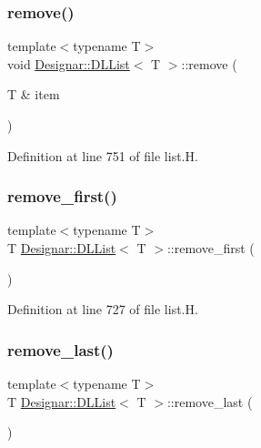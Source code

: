 \subsubsection{\texorpdfstring{remove()}{remove()}}
{\footnotesize\ttfamily template$<$typename T$>$ \\
void \hyperlink{class_designar_1_1_d_l_list}{Designar\+::\+D\+L\+List}$<$ T $>$\+::remove (\begin{DoxyParamCaption}\item[{T \&}]{item }\end{DoxyParamCaption})\hspace{0.3cm}{\ttfamily [inline]}}



Definition at line 751 of file list.\+H.

\mbox{\label{class_designar_1_1_d_l_list_a62e4c39df6ba191e7cd8dadac70109fb}} 
\subsubsection{\texorpdfstring{remove\+\_\+first()}{remove\_first()}}
{\footnotesize\ttfamily template$<$typename T$>$ \\
T \hyperlink{class_designar_1_1_d_l_list}{Designar\+::\+D\+L\+List}$<$ T $>$\+::remove\+\_\+first (\begin{DoxyParamCaption}{ }\end{DoxyParamCaption})\hspace{0.3cm}{\ttfamily [inline]}}



Definition at line 727 of file list.\+H.

\mbox{\label{class_designar_1_1_d_l_list_ac64bdba91bd7ff758fbb0e29f50dadcd}} 
\subsubsection{\texorpdfstring{remove\+\_\+last()}{remove\_last()}}
{\footnotesize\ttfamily template$<$typename T$>$ \\
T \hyperlink{class_designar_1_1_d_l_list}{Designar\+::\+D\+L\+List}$<$ T $>$\+::remove\+\_\+last (\begin{DoxyParamCaption}{ }\end{DoxyParamCaption})\hspace{0.3cm}{\ttfamily [inline]}}



